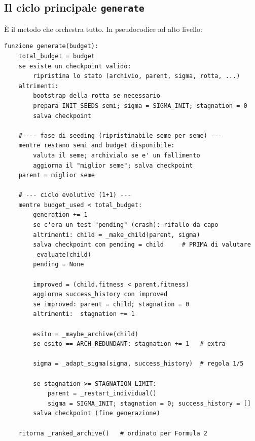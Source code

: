 \documentclass[11pt,a4paper]{report}
\begin{document}
\subsection{Il ciclo principale \texttt{generate}}
È il metodo che orchestra tutto. In pseudocodice ad alto livello:
\begin{lstlisting}[style=pseudo]
funzione generate(budget):
    total_budget = budget
    se esiste un checkpoint valido:
        ripristina lo stato (archivio, parent, sigma, rotta, ...)
    altrimenti:
        bootstrap della rotta se necessario
        prepara INIT_SEEDS semi; sigma = SIGMA_INIT; stagnation = 0
        salva checkpoint

    # --- fase di seeding (ripristinabile seme per seme) ---
    mentre restano semi and budget disponibile:
        valuta il seme; archivialo se e' un fallimento
        aggiorna il "miglior seme"; salva checkpoint
    parent = miglior seme

    # --- ciclo evolutivo (1+1) ---
    mentre budget_used < total_budget:
        generation += 1
        se c'era un test "pending" (crash): rifallo da capo
        altrimenti: child = _make_child(parent, sigma)
        salva checkpoint con pending = child     # PRIMA di valutare
        _evaluate(child)
        pending = None

        improved = (child.fitness < parent.fitness)
        aggiorna success_history con improved
        se improved: parent = child; stagnation = 0
        altrimenti:  stagnation += 1

        esito = _maybe_archive(child)
        se esito == ARCH_REDUNDANT: stagnation += 1   # extra

        sigma = _adapt_sigma(sigma, success_history)  # regola 1/5

        se stagnation >= STAGNATION_LIMIT:
            parent = _restart_individual()
            sigma = SIGMA_INIT; stagnation = 0; success_history = []
        salva checkpoint (fine generazione)

    ritorna _ranked_archive()   # ordinato per Formula 2
\end{lstlisting}
\end{document}
